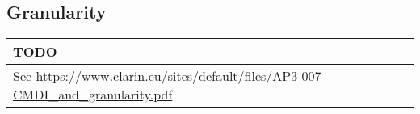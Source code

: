 \subsection{Granularity}\label{granularity}

\begin{longtable}[c]{@{}l@{}}
\toprule
\begin{minipage}[b]{0.07\columnwidth}\raggedright\strut
TODO
\strut\end{minipage}\tabularnewline
\midrule
\endhead
\begin{minipage}[t]{0.07\columnwidth}\raggedright\strut
See
\url{https://www.clarin.eu/sites/default/files/AP3-007-CMDI_and_granularity.pdf}
\strut\end{minipage}\tabularnewline
\bottomrule
\end{longtable}
